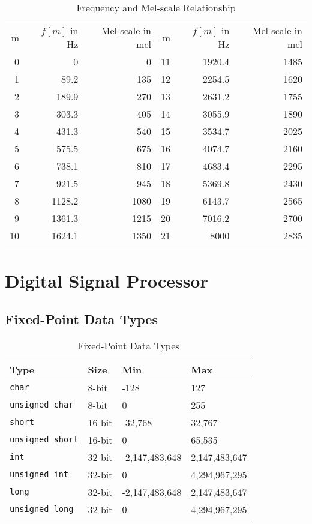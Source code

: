 \begin{table}[H]
\centering
\caption{Frequency and Mel-scale Relationship}
\label{table:frequency-mel-relationship}
\begin{tabular}{rrr|rrr}
\toprule
m &$f[m]$ in Hz &Mel-scale in mel &m &$f[m]$ in Hz &Mel-scale in mel\\
0  & 0      & 0    & 11 & 1920.4 & 1485\\
1  & 89.2   & 135  & 12 & 2254.5 & 1620\\
2  & 189.9  & 270  & 13 & 2631.2 & 1755\\
3  & 303.3  & 405  & 14 & 3055.9 & 1890\\
4  & 431.3  & 540  & 15 & 3534.7 & 2025\\
5  & 575.5  & 675  & 16 & 4074.7 & 2160\\
6  & 738.1  & 810  & 17 & 4683.4 & 2295\\
7  & 921.5  & 945  & 18 & 5369.8 & 2430\\
8  & 1128.2 & 1080 & 19 & 6143.7 & 2565\\
9  & 1361.3 & 1215 & 20 & 7016.2 & 2700\\
10 & 1624.1 & 1350 & 21 & 8000   & 2835\\
\bottomrule
\end{tabular}
\end{table}


\section{Digital Signal Processor}

\subsection{Fixed-Point Data Types}

\begin{table}[H]
\centering
\caption{Fixed-Point Data Types}
\label{fixed-point-data-types}
\begin{tabu} to \textwidth {XXXX}
\toprule
Type &Size &Min &Max\\
\hline
\texttt{char} &8-bit &-128 &127\\
\hline
\texttt{unsigned char} &8-bit &0 &255\\
\hline
\texttt{short} &16-bit &-32,768 &32,767\\
\hline
\texttt{unsigned short} &16-bit &0 &65,535\\
\hline
\texttt{int} &32-bit &-2,147,483,648 &2,147,483,647\\
\hline
\texttt{unsigned int} &32-bit &0 &4,294,967,295\\
\hline
\texttt{long} &32-bit &-2,147,483,648 &2,147,483,647\\
\hline
\texttt{unsigned long} &32-bit &0 &4,294,967,295\\
\bottomrule
\end{tabu}
\end{table}


